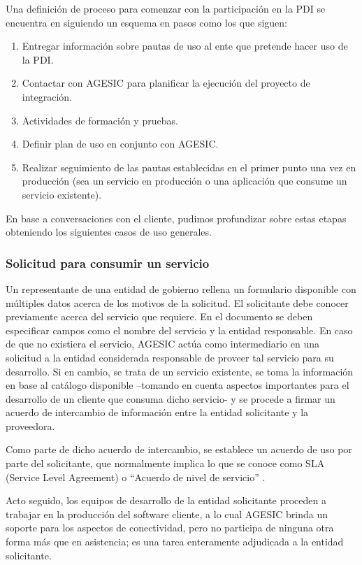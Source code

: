 Una definición de proceso para comenzar con la participación en la PDI se encuentra en \cite{Agesic:GuiaUsos} siguiendo un esquema en pasos como los que siguen:
				\begin{enumerate}
				\item Entregar información sobre pautas de uso al ente que pretende hacer uso de la PDI.
				\item Contactar con AGESIC para planificar la ejecución del proyecto de integración.
				\item Actividades de formación y pruebas.
				\item Definir plan de uso en conjunto con AGESIC.
				\item Realizar seguimiento de las pautas establecidas en el primer punto una vez en producción (sea un servicio en producción o una aplicación que consume un servicio existente).
				\end{enumerate}
En base a conversaciones con el cliente, pudimos profundizar sobre estas etapas obteniendo los siguientes casos de uso generales.
\subsubsection{Solicitud para consumir un servicio}	
\label{Analisis:Solicitudparaconsumirunservicio}
Un representante de una entidad de gobierno rellena un formulario disponible con múltiples datos acerca de los motivos de la solicitud. \cite{Agesic:FormularioSolicitudV2.5} El solicitante debe conocer previamente acerca del servicio que requiere. En el documento se deben especificar campos como el nombre del servicio y la entidad responsable. En caso de que no existiera el servicio, AGESIC actúa como intermediario en una solicitud a la entidad considerada responsable de proveer tal servicio para su desarrollo.  Si en cambio, se trata de un servicio existente, se toma la información en base al catálogo disponible –tomando en cuenta aspectos importantes para el desarrollo de un cliente que consuma dicho servicio- y se procede a firmar un acuerdo de intercambio de información entre la entidad solicitante y la proveedora.

Como parte de dicho acuerdo de intercambio, se establece un acuerdo de uso por parte del solicitante, que normalmente implica lo que se conoce como SLA (Service Level Agreement) o “Acuerdo de nivel de servicio” .

Acto seguido, los equipos de desarrollo de la entidad solicitante proceden a trabajar en la producción del software cliente, a lo cual AGESIC brinda un soporte para los aspectos de conectividad, pero no participa de ninguna otra forma más que en asistencia; es una tarea enteramente adjudicada a la entidad solicitante.

